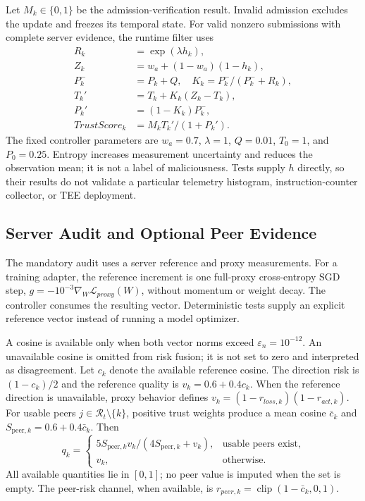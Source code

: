\documentclass[conference,compsoc]{IEEEtran}
\begin{document}
Let $M_k\in\{0,1\}$ be the admission-verification result. Invalid admission
excludes the update and freezes its temporal state. For valid nonzero
submissions with complete server evidence, the runtime filter uses
\begin{align}
    R_k          & =\exp(\lambda h_k),                 \\
    Z_k          & =w_a+(1-w_a)(1-h_k),                \\
    P_k^-        & =P_k+Q,\quad K_k=P_k^-/(P_k^-+R_k), \\
    T_k'         & =T_k+K_k(Z_k-T_k),                  \\
    P_k'         & =(1-K_k)P_k^-,                      \\
    TrustScore_k & =M_k T_k'/(1+P_k').
\end{align}
The fixed controller parameters are $w_a=0.7$, $\lambda=1$, $Q=0.01$,
$T_0=1$, and $P_0=0.25$. Entropy increases measurement uncertainty and reduces
the observation mean; it is not a label of maliciousness. Tests supply $h$
directly, so their results do not validate a particular telemetry histogram,
instruction-counter collector, or TEE deployment.

\subsection{Server Audit and Optional Peer Evidence}

The mandatory audit uses a server reference and proxy measurements. For a
training adapter, the reference increment is one full-proxy cross-entropy
SGD step, $g=-10^{-3}\nabla_W\mathcal L_{proxy}(W)$, without momentum or weight
decay. The controller consumes the resulting vector. Deterministic tests
supply an explicit reference vector instead of running a model optimizer.

A cosine is available only when both vector norms exceed
$\varepsilon_n=10^{-12}$. An unavailable cosine is omitted from risk fusion;
it is not set to zero and interpreted as disagreement. Let $c_k$ denote the
available reference cosine. The direction risk is $(1-c_k)/2$ and the
reference quality is $v_k=0.6+0.4c_k$. When the reference direction is
unavailable, proxy behavior defines $v_k=(1-r_{loss,k})(1-r_{act,k})$.
For usable peers $j\in\mathcal R_t\setminus\{k\}$, positive trust weights
produce a mean cosine $\bar c_k$ and $S_{\mathrm{peer},k}=0.6+0.4\bar c_k$. Then
\begin{equation}
    q_k=\begin{cases}
        5S_{\mathrm{peer},k}v_k/(4S_{\mathrm{peer},k}+v_k), & \text{usable peers exist}, \\
        v_k,                & \text{otherwise}.
    \end{cases}
\end{equation}
All available quantities lie in $[0,1]$; no peer value is imputed when the set
is empty. The peer-risk channel, when available, is
$r_{peer,k}=\operatorname{clip}(1-\bar c_k,0,1)$.
\end{document}
